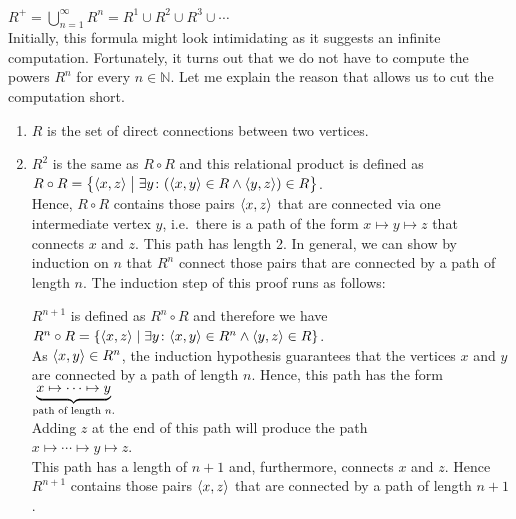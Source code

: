 \hspace*{1.3cm}
$R^+ = \bigcup\limits_{n=1}^{\infty} R^n = R^1 \cup R^2 \cup R^3 \cup \cdots$  
\\[0.2cm]
Initially, this formula might look intimidating as it suggests an infinite computation.
Fortunately, it turns out that we do not have to compute the powers $R^n$ for every $n \in \mathbb{N}$.  Let me
explain the reason that allows us to cut the computation short.  
\begin{enumerate}
\item $R$ is the set of direct connections between two vertices.
\item $R^2$ is the same as $R \circ R$ and this relational product is defined as
      \\[0.2cm]
      \hspace*{1.3cm}
       $R \circ R = \bigl\{ \pair(x,z) \bigm| \exists y \colon(\pair(x,y) \in R \wedge \pair(y,z)) \in R \bigr\}$.
      \\[0.2cm]
      Hence, $R \circ R$ contains those pairs $\pair(x,z)$ that are connected via one intermediate vertex $y$,
      i.e.~there is a path of the form $x \mapsto y \mapsto z$ that connects $x$ and $z$.  This path
      has length 2.  In general, we can show by induction on $n$ that $R^n$ connect those pairs that are
      connected by a path of length $n$.  The induction step of this proof runs as follows:

      $R^{n+1}$ is defined as $R^n \circ R$ and therefore we have
      \\[0.2cm]
      \hspace*{1.3cm}
      $R^n \circ R = \{ \pair(x,z) \mid \exists y \colon \pair(x,y) \in R^n \wedge \pair(y,z) \in R \}$.
      \\[0.2cm]
      As $\pair(x,y) \in R^n$, the induction hypothesis guarantees that the vertices $x$ and $y$ are
      connected by a path of length $n$.  Hence, this 
      path has the form
      \\[0.2cm]
      \hspace*{1.3cm}
      $\underbrace{x \mapsto \cdots \mapsto y}_{\mbox{\scriptsize path of length $n$.}}$
      \\[0.2cm]
      Adding $z$ at the end of this path will produce the path
      \\[0.2cm]
      \hspace*{1.3cm}
      $x \mapsto \cdots \mapsto y \mapsto z$.
      \\[0.2cm]
      This path has a length of $n + 1$ and, furthermore, connects $x$ and $z$.  Hence $R^{n+1}$
      contains those pairs $\pair(x, z)$ that are connected by a path of length $n+1$.
\end{enumerate}
